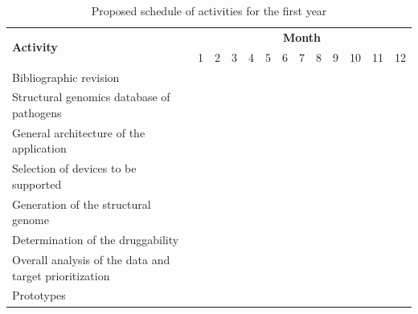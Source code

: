 \documentclass[a4paper,10pt]{article}
\begin{document}
\begin{table}[ht!]
\centering
\begin{tabular}{|p{8cm}| *{12}{p{0.3cm}|}}
\hline
\multirow{2}{*}{\textbf{Activity}} & \multicolumn{12}{c|}{\textbf{Month}} \\
\cline{2-13}
 & 1 & 2 & 3 & 4 & 5 & 6 & 7 & 8 & 9 & 10 & 11 & 12\\
\hline
Bibliographic revision & \cellcolor[gray]{0.6} & \cellcolor[gray]{0.6} & \cellcolor[gray]{0.6} & & & & & & & & & \\
\hline

Structural genomics database of pathogens & & \cellcolor[gray]{0.6} & \cellcolor[gray]{0.6} & \cellcolor[gray]{0.6} & \cellcolor[gray]{0.6} & \cellcolor[gray]{0.6} & \cellcolor[gray]{0.6} & & & & & \\
\hline

General architecture of the application & & \cellcolor[gray]{0.6} & \cellcolor[gray]{0.6} & \cellcolor[gray]{0.6} & & & & & & & & \\
\hline

Selection of devices to be supported & & & & \cellcolor[gray]{0.6} & \cellcolor[gray]{0.6} & \cellcolor[gray]{0.6} & \cellcolor[gray]{0.6} & & & & & \\
\hline

Generation of the structural genome & & & & & & \cellcolor[gray]{0.6} & \cellcolor[gray]{0.6} & \cellcolor[gray]{0.6} & \cellcolor[gray]{0.6}& & & \\
\hline

Determination of the druggability & & & & & & & & \cellcolor[gray]{0.6}& \cellcolor[gray]{0.6}& & & \\

\hline

Overall analysis of the data and target prioritization & & & & & & & \cellcolor[gray]{0.6} & \cellcolor[gray]{0.6} & \cellcolor[gray]{0.6}& \cellcolor[gray]{0.6}& \cellcolor[gray]{0.6}& \cellcolor[gray]{0.6}\\

\hline

Prototypes & & & & & & \cellcolor[gray]{0.6} & \cellcolor[gray]{0.6} & \cellcolor[gray]{0.6} & \cellcolor[gray]{0.6}& \cellcolor[gray]{0.6}& \cellcolor[gray]{0.6}& \cellcolor[gray]{0.6}\\
\hline
\end{tabular}
\caption{Proposed schedule of activities for the first year}
\label{Tab:Firstyear}
\end{table}
\end{document}
